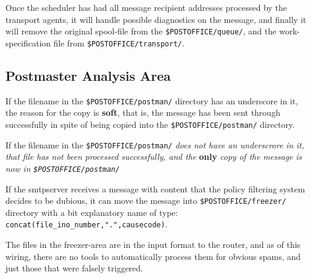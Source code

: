 Once the scheduler has had all message recipient addresses 
processed by the transport agents, it will handle possible
diagnostics on the message, and finally it will remove the
original spool-file from the {\tt \$POSTOFFICE/queue/}, and 
the work-specification file from {\tt \$POSTOFFICE/transport/}.




\subsection{Postmaster Analysis Area\label{postmaster_analysis_area}}



If the filename in the {\tt \$POSTOFFICE/postman/} directory has an 
underscore in it, the reason for the copy is {\bf soft}, that is, the 
message has been sent through successfully in spite of being copied into
the {\tt \$POSTOFFICE/postman/} directory.

If the filename in the {\tt \$POSTOFFICE/postman/}
{\em does not have an underscrore in it, that file has not been processed
successfully, and the} {\bf only} {\em copy of the message
is now in {\tt \$POSTOFFICE/postman/}}

If the  smtpserver  receives a message with content that the policy filtering
system decides to be dubious, it can move the message into
{\tt \$POSTOFFICE/freezer/} directory with a bit explanatory name of type:
{\small\tt concat(file\_ino\_number,".",causecode)}.

The files in the freezer-area are in the input format to the router, and
as of this wiring, there are no tools to automatically process them for
obvious spams, and just those that were falsely triggered.

